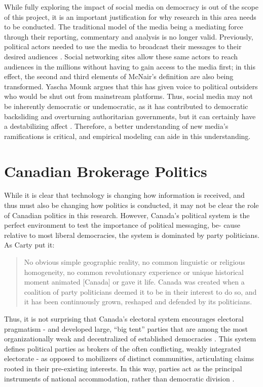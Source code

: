 While fully exploring the impact of social media on democracy is out of the
scope of this project, it is an important justification for why research in this
area needs to be conducted. The traditional model of the media being a mediating
force through their reporting, commentary and analysis is no longer valid.
Previously, political actors needed to use the media to broadcast their messages
to their desired audiences \cite{mcnair2017introduction}. Social networking
sites allow these same actors to reach audiences in the millions without having
to gain access to the media first; in this effect, the second and third elements
of McNair’s definition are also being transformed. Yascha Mounk argues that this
has given voice to political outsiders who would be shut out from mainstream
platforms. Thus, social media may not be inherently democratic or undemocratic,
as it has contributed to democratic backsliding and overturning authoritarian
governments, but it can certainly have a destabilizing affect
\cite{mounk2018people}. Therefore, a better understanding of new media’s
ramifications is critical, and empirical modeling can aide in this
understanding.

\section{Canadian Brokerage Politics}

While it is clear that technology is changing how information is received, and
thus must also be changing how politics is conducted, it may not be clear the
role of Canadian politics in this research. However, Canada’s political system
is the perfect environment to test the importance of political messaging, be-
cause relative to most liberal democracies, the system is dominated by party
politicians. As Carty put it:

\begin{quote}
No obvious simple geographic reality, no common linguistic or religious
homogeneity, no common revolutionary experience or unique historical moment
animated [Canada] or gave it life. Canada was created when a coalition of party
politicians deemed it to be in their interest to do so, and it has been
continuously grown, reshaped and defended by its politicians.
\cite{carty2010political}
\end{quote}

Thus, it is not surprising that Canada’s electoral system encourages electoral
pragmatism - and developed large, “big tent” parties that are among the most
organizationally weak and decentralized of established democracies
\cite{carty2010political}. This system defines political parties as brokers of the
often conflicting, weakly integrated electorate - as opposed to mobilizers of
distinct communities, articulating claims rooted in their pre-existing
interests. In this way, parties act as the principal instruments of national
accommodation, rather than democratic division \cite{carty2010political}.

